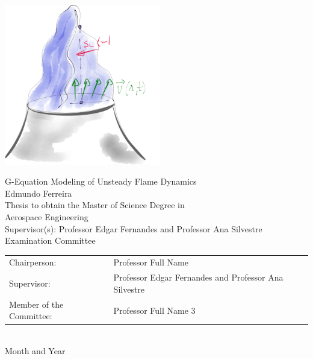 \begin{center}
%
\vspace{1.6cm}
\includegraphics[height=70mm]{img/aguarela2.png}

\vspace{1.0cm}
{\FontLb G-Equation Modeling of Unsteady Flame Dynamics} \\
\vspace{2.0cm}
{\FontMb Edmundo Ferreira} \\
\vspace{2.0cm}
{\FontSn Thesis to obtain the Master of Science Degree in} \\
\vspace{0.3cm}
{\FontLb Aerospace Engineering} \\
\vspace{1.1cm}
{\FontSn Supervisor(s): Professor Edgar Fernandes and Professor Ana Silvestre} \\
\vspace{1.1cm}
{\FontMb Examination Committee} \\
\vspace{0.3cm}
{\FontSn %
\begin{tabular}{ll}
Chairperson: & Professor Full Name \\
Supervisor: & Professor Edgar Fernandes and Professor Ana Silvestre \\
Member of the Committee: & Professor Full Name 3
\end{tabular} } \\
\vspace{1.5cm}
{\FontMb Month and Year} \\
%
\end{center}

\cleardoublepage

